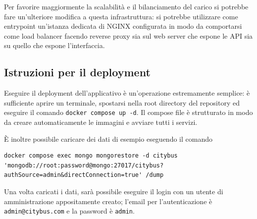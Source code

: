 Per favorire maggiormente la scalabilità e il bilanciamento del carico si potrebbe fare un'ulteriore modifica a questa infrastruttura: si potrebbe utilizzare come entrypoint un'istanza dedicata di NGINX configurata in modo da comportarsi come load balancer facendo reverse proxy sia sul web server che espone le API sia su quello che espone l'interfaccia.

\subsection{Istruzioni per il deployment}

Eseguire il deployment dell'applicativo è un'operazione estremamente semplice: è sufficiente aprire un terminale, spostarsi nella root directory del repository ed eseguire il comando \verb|docker compose up -d|. Il compose file è strutturato in modo da creare automaticamente le immagini e avviare tutti i servizi.

È inoltre possibile caricare dei dati di esempio eseguendo il comando
\begin{lstlisting}
docker compose exec mongo mongorestore -d citybus 'mongodb://root:password@mongo:27017/citybus?authSource=admin&directConnection=true' /dump
\end{lstlisting}
Una volta caricati i dati, sarà possibile eseguire il login con un utente di amministrazione appositamente creato; l'email per l'autenticazione è \verb|admin@citybus.com| e la password è \verb|admin|.
